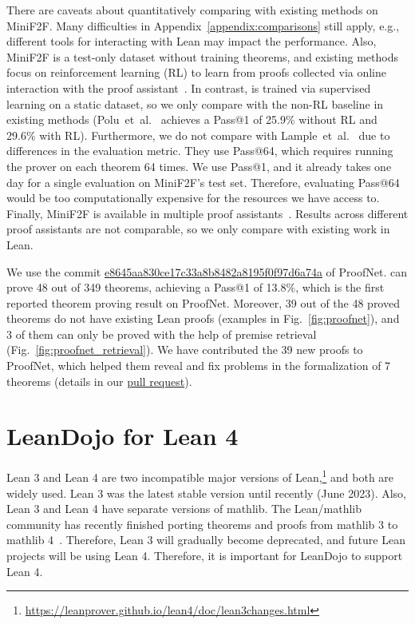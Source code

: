 There are caveats about quantitatively comparing {\name} with existing methods on MiniF2F. Many difficulties in Appendix~\ref{appendix:comparisons} still apply, e.g., different tools for interacting with Lean may impact the performance. Also, MiniF2F is a test-only dataset without training theorems, and existing methods focus on reinforcement learning (RL) to learn from proofs collected via online interaction with the proof assistant~\cite{polu2023formal,lample2022hypertree}. In contrast, {\name} is trained via supervised learning on a static dataset, so we only compare with the non-RL baseline in existing methods (Polu~et~al.~\cite{polu2023formal} achieves a Pass@1 of 25.9\% without RL and 29.6\% with RL). Furthermore, we do not compare with Lample~et~al.~\cite{lample2022hypertree} due to differences in the evaluation metric. They use Pass@64, which requires running the prover on each theorem 64 times. We use Pass@1, and it already takes one day for a single evaluation on MiniF2F's test set. Therefore, evaluating Pass@64 would be too computationally expensive for the resources we have access to. Finally, MiniF2F is available in multiple proof assistants~\cite{jiang2022thor,jiang2023draft,zhao2023decomposing}. Results across different proof assistants are not comparable, so we only compare with existing work in Lean.


We use the commit \href{https://github.com/zhangir-azerbayev/ProofNet/commit/e8645aa830ce17c33a8b8482a8195f0f97d6a74a}{e8645aa830ce17c33a8b8482a8195f0f97d6a74a} of ProofNet. {\name} can prove 48 out of 349 theorems, achieving a Pass@1 of 13.8\%, which is the first reported theorem proving result on ProofNet. Moreover, 39 out of the 48 proved theorems do not have existing Lean proofs (examples in Fig.~\ref{fig:proofnet}), and 3 of them can only be proved with the help of premise retrieval (Fig.~\ref{fig:proofnet_retrieval}).
We have contributed the 39 new proofs to ProofNet, which helped them reveal and fix problems in the formalization of 7 theorems (details in our \href{https://github.com/zhangir-azerbayev/ProofNet/pull/14}{pull request}).



\section{LeanDojo for Lean 4}
\label{appendix:lean4}

Lean 3 and Lean 4 are two incompatible major versions of Lean,\footnote{\url{https://leanprover.github.io/lean4/doc/lean3changes.html}} and both are widely used. Lean 3 was the latest stable version until recently (June 2023). Also, Lean 3 and Lean 4 have separate versions of mathlib. The Lean/mathlib community has recently finished porting theorems and proofs from mathlib 3 to mathlib 4~\cite{mathport}. Therefore, Lean 3 will gradually become deprecated, and future Lean projects will be using Lean 4. Therefore, it is important for LeanDojo to support Lean 4.

